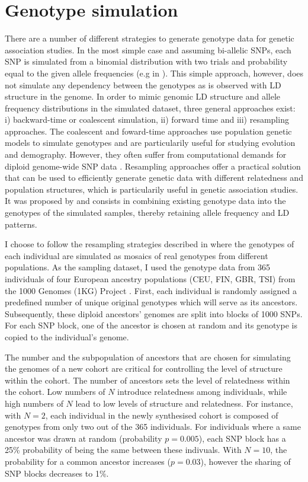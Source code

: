 \section{Genotype simulation}
\label{section:genotype-simulation}
There are a number of different strategies to generate genotype data for genetic association studies. In the most simple case and assuming bi-allelic SNPs, each SNP is simulated from a binomial distribution with two trials and probability equal to the given allele frequencies  (e.g in \citep{Lippert2013}). This simple approach, however, does not simulate any dependency between the genotypes as is observed with LD structure in the genome. In order to mimic genomic LD structure and allele frequency distributions in the simulated dataset, three general approaches exist: i) backward-time or coalescent simulation, ii) forward time and iii) resampling approaches. The coalescent \citep{Hudson2002,Ewing2010,Kelleher2016} and foward-time approaches \citep{Peng2007,Hoggart2007,Carvajal-Rodriguez2008} use population genetic models to simulate genotypes and are particularily useful for studying evolution and demography. However, they often suffer from computational demands for diploid genome-wide SNP data \citep{Liu2008,Yuan2012}. Resampling approaches offer a practical solution that can be used to efficiently generate genetic data with different relatedness and population structures, which is particularily useful in genetic association studies. It was proposed by \citet{Wright2007} and consists in combining existing genotype data into the genotypes of the simulated samples, thereby retaining allele frequency and LD patterns. 

I choose to follow the resampling strategies described in \citep{Loh2014,Casale2015} where the genotypes of each individual are simulated as mosaics of real genotypes from different populations. As the sampling dataset, I used the genotype data from \num{365} individuals of four European ancestry populations (CEU, FIN, GBR, TSI) from the 1000 Genomes (1KG) Project \citep{1000Genomes2015}.  First, each individual is randomly assigned a predefined number of unique original genotypes which will serve as its ancestors. Subsequently, these diploid ancestors' genomes are split into blocks of \num{1000} SNPs. For each SNP block, one of the ancestor is chosen at random and its genotype is copied to the individual's genome. 

The number and the subpopulation of ancestors that are chosen for simulating the genomes of a new cohort are critical for controlling the level of structure within the cohort. The number of ancestors sets the level of relatedness within the cohort. Low numbers of \(N\) introduce relatedness among individuals, while high numbers of \(N\) lead to low levels of structure and relatedness.  For instance, with \(N=2\), each individual in the newly synthesised cohort is composed of genotypes from only two out of the \num{365} individuals. For individuals where a same ancestor was drawn at random (probability \(p=0.005\)), each SNP block has a \num{25}\% probability of being the same between these indivuals. With \(N=10\), the probability for a common ancestor increases (\(p=0.03\)), however the sharing of SNP blocks decreases to \num{1}\%. 

